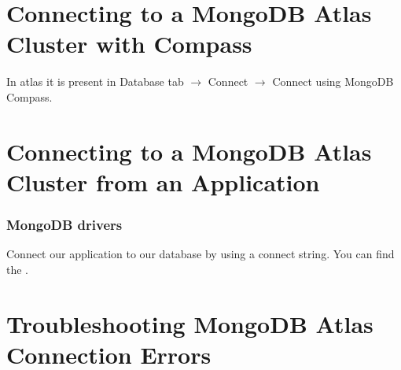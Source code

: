 \documentclass[../main.tex]{subfiles}
\begin{document}
\section{Connecting to a MongoDB Atlas Cluster with Compass}
In atlas it is present in Database tab $\rightarrow$ Connect $\rightarrow$ Connect using MongoDB Compass.

\section{Connecting to a MongoDB Atlas Cluster from an Application}
\subsubsection{MongoDB drivers} 
Connect our application to our database by using a connect string.
You can find the \href{mongodb.com/docs/drivers}{\color{blue}{mongodb drivers list here}}.

\section{Troubleshooting MongoDB Atlas Connection Errors}


\printglossaries
\end{document}
